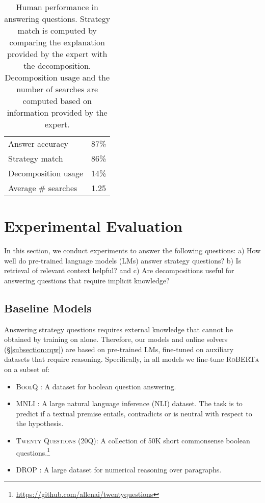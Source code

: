 {\begin{table}
    \centering
    \footnotesize
    \begin{tabular}{l|c}
         Answer accuracy & 87\%  \\
         Strategy match & 86\% \\
         Decomposition usage & 14\% \\
         Average \# searches & 1.25
    \end{tabular}
    \caption{Human performance in answering questions. Strategy match is computed by comparing the explanation provided by the expert with the decomposition. Decomposition usage and the number of searches are computed based on information provided by the expert.}
    \label{table:human_performance}
\end{table}

\section{Experimental Evaluation}
\label{sec:experiments}

In this section, we conduct experiments to answer the following questions: a) How well do pre-trained language models (LMs) answer strategy questions? b) Is retrieval of relevant context helpful? and c) Are decompositions useful for answering questions that require implicit knowledge?

\subsection{Baseline Models}
\label{subsec:baselines}

Answering strategy questions requires external knowledge that cannot be obtained by training on \strategyqa{} alone. Therefore, our models and online solvers (\S\ref{subsection:cqw}) are based on pre-trained LMs, fine-tuned on auxiliary datasets that require reasoning. Specifically, in all models we fine-tune \textsc{RoBERTa} \cite{liu2019roberta} on a subset of:
\begin{itemize}[leftmargin=*,topsep=5pt,itemsep=0pt,parsep=0pt]
    \item \textsc{BoolQ} \cite{clark2019boolq}: A dataset for boolean question answering.
    \item \textsc{MNLI} \cite{williams2018broad}: A large natural language inference (NLI) dataset. The task is to predict if a textual premise entails, contradicts or is neutral with respect to the hypothesis.
    \item \textsc{Twenty Questions} (\textsc{20Q}): A collection of 50K short commonsense boolean questions.\footnote{\url{https://github.com/allenai/twentyquestions}}
    \item \textsc{DROP} \cite{dua2019drop}: A large dataset for numerical reasoning over paragraphs.
\end{itemize}

}
